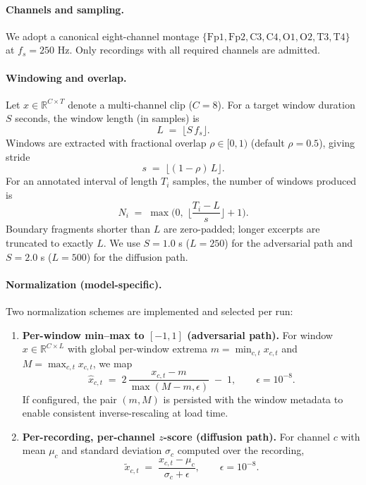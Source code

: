 \documentclass{article}
\begin{document}
\paragraph{Channels and sampling.}
We adopt a canonical eight-channel montage \(\{\text{Fp1}, \text{Fp2}, \text{C3}, \text{C4}, \text{O1}, \text{O2}, \text{T3}, \text{T4}\}\) at \(f_s = 250\) Hz. Only recordings with all required channels are admitted.

\paragraph{Windowing and overlap.}
Let \(x \in \mathbb{R}^{C \times T}\) denote a multi-channel clip (\(C{=}8\)). For a target window duration \(S\) seconds, the window length (in samples) is
\begin{equation}
L \;=\; \big\lfloor S \, f_s \big\rfloor .
\end{equation}
Windows are extracted with fractional overlap \(\rho \in [0,1)\) (default \(\rho{=}0.5\)), giving stride
\begin{equation}
s \;=\; \big\lfloor (1-\rho)\,L \big\rfloor .
\end{equation}
For an annotated interval of length \(T_i\) samples, the number of windows produced is
\begin{equation}
N_i \;=\; \max\!\Big(0,\; \Big\lfloor \frac{T_i - L}{s} \Big\rfloor + 1 \Big).
\end{equation}
Boundary fragments shorter than \(L\) are zero-padded; longer excerpts are truncated to exactly \(L\).
We use \(S{=}1.0\) s (\(L{=}250\)) for the adversarial path and \(S{=}2.0\) s (\(L{=}500\)) for the diffusion path.

\paragraph{Normalization (model-specific).}
Two normalization schemes are implemented and selected per run:
\begin{enumerate}
\item \textbf{Per-window min--max to \([-1,1]\) (adversarial path).} For window \(x \in \mathbb{R}^{C\times L}\) with global per-window extrema \(m=\min_{c,t} x_{c,t}\) and \(M=\max_{c,t} x_{c,t}\), we map
\begin{equation}
\hat{x}_{c,t} \;=\; 2\,\frac{x_{c,t}-m}{\max(M-m,\epsilon)} \;-\; 1, \qquad \epsilon = 10^{-8}.
\end{equation}
If configured, the pair \((m,M)\) is persisted with the window metadata to enable consistent inverse-rescaling at load time.
\item \textbf{Per-recording, per-channel \(z\)-score (diffusion path).} For channel \(c\) with mean \(\mu_c\) and standard deviation \(\sigma_c\) computed over the recording,
\begin{equation}
\tilde{x}_{c,t} \;=\; \frac{x_{c,t}-\mu_c}{\sigma_c + \epsilon}, \qquad \epsilon = 10^{-8}.
\end{equation}
\end{enumerate}
\end{document}
